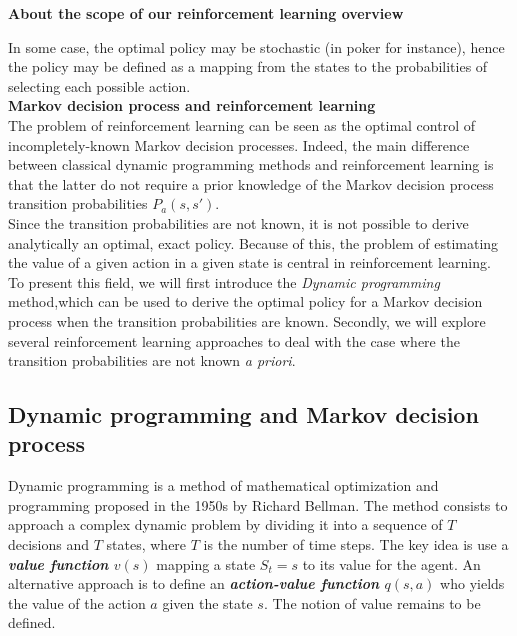 \documentclass[11pt, onecolumn, a4paper]{report}
\begin{document}
\textbf{\Large About the scope of our reinforcement learning overview}



In some case, the optimal policy may be stochastic (in poker for instance), hence the policy may be defined as a mapping from the states to the probabilities of selecting each possible action.\\


\textbf{Markov decision process and reinforcement learning}\\


The problem of reinforcement learning can be seen as the optimal control of incompletely-known Markov decision processes. Indeed, the main difference between classical dynamic programming methods and reinforcement learning is that the latter do not require a prior knowledge of the Markov decision process transition probabilities $P_{a}(s,s')$.\\
 
Since the transition probabilities are not known, it is not possible to derive analytically an optimal, exact policy. Because of this, the problem of estimating the value of a given action in a given state is central in reinforcement learning.\\

To present this field, we will first introduce the \textit{Dynamic programming} method,which can be used to derive the optimal policy for a Markov decision process when the transition probabilities are known. Secondly, we will explore several reinforcement learning approaches to deal with the case where the transition probabilities are not known \textit{a priori}.

\subsection{Dynamic programming and Markov decision process}

Dynamic programming is a method of mathematical optimization and programming proposed in the 1950s by Richard Bellman. 
The method consists to approach a complex dynamic problem by dividing it into a sequence of $T$ decisions and $T$ states, where $T$ is the number of time steps. The key idea is use a \textbf{\textit{value function} $v(s)$} mapping a state $S_t=s$ to its value for the agent. An alternative approach is to define an \textbf{\textit{action-value function} $q(s,a)$} who yields the value of the action $a$ given the state $s$. The notion of value remains to be defined. \\
\end{document}
